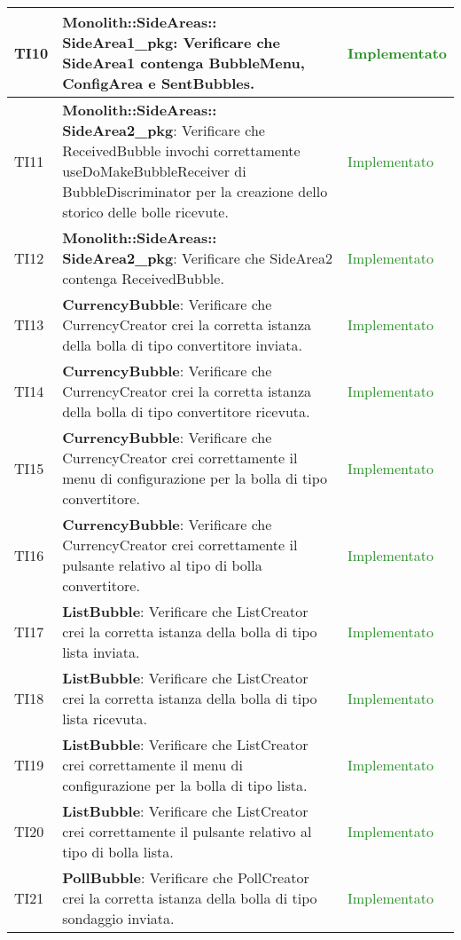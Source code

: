 \begin{center}
\begin{longtable}{|
*{1}{>{\centering\arraybackslash}p{1cm}|}
*{1}{>{\centering\arraybackslash}p{7cm}|}
*{1}{>{\centering\arraybackslash}p{3cm}|}}
 \hline 
TI10 & \textbf{Monolith::SideAreas:: SideArea1\_pkg}: Verificare che SideArea1 contenga BubbleMenu, ConfigArea e SentBubbles. & \textcolor{ForestGreen}{Implementato}\\
 \hline 
TI11 & \textbf{Monolith::SideAreas:: SideArea2\_pkg}: Verificare che ReceivedBubble invochi correttamente useDoMakeBubbleReceiver di BubbleDiscriminator per la creazione dello storico delle bolle ricevute. & \textcolor{ForestGreen}{Implementato}\\
 \hline 
TI12 & \textbf{Monolith::SideAreas:: SideArea2\_pkg}: Verificare che SideArea2 contenga ReceivedBubble. & \textcolor{ForestGreen}{Implementato}\\
 \hline 
TI13 & \textbf{CurrencyBubble}: Verificare che CurrencyCreator crei la corretta istanza della bolla di tipo convertitore inviata. & \textcolor{ForestGreen}{Implementato}\\
 \hline 
TI14 & \textbf{CurrencyBubble}: Verificare che CurrencyCreator crei la corretta istanza della bolla di tipo convertitore ricevuta. & \textcolor{ForestGreen}{Implementato}\\
 \hline 
TI15 & \textbf{CurrencyBubble}: Verificare che CurrencyCreator crei correttamente il menu di configurazione per la bolla di tipo convertitore. & \textcolor{ForestGreen}{Implementato}\\
 \hline 
TI16 & \textbf{CurrencyBubble}: Verificare che CurrencyCreator crei correttamente il pulsante relativo al tipo di bolla convertitore. & \textcolor{ForestGreen}{Implementato}\\
 \hline 
TI17 & \textbf{ListBubble}: Verificare che ListCreator crei la corretta istanza della bolla di tipo lista inviata. & \textcolor{ForestGreen}{Implementato}\\
 \hline 
TI18 & \textbf{ListBubble}: Verificare che ListCreator crei la corretta istanza della bolla di tipo lista ricevuta. & \textcolor{ForestGreen}{Implementato}\\
 \hline 
TI19 & \textbf{ListBubble}: Verificare che ListCreator crei correttamente il menu di configurazione per la bolla di tipo lista. & \textcolor{ForestGreen}{Implementato}\\
 \hline 
TI20 & \textbf{ListBubble}: Verificare che ListCreator crei correttamente il pulsante relativo al tipo di bolla lista. & \textcolor{ForestGreen}{Implementato}\\
 \hline 
TI21 & \textbf{PollBubble}: Verificare che PollCreator crei la corretta istanza della bolla di tipo sondaggio inviata. & \textcolor{ForestGreen}{Implementato}\\

\end{longtable}
\end{center}
